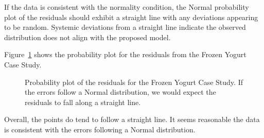 \documentclass[
  letterpaper,
  DIV=11,
  numbers=noendperiod]{scrreprt}
\theoremstyle{plain}
\theoremstyle{definition}
\theoremstyle{definition}
\theoremstyle{remark}
\begin{document}
\begin{tcolorbox}[enhanced jigsaw, breakable, titlerule=0mm, colframe=quarto-callout-note-color-frame, bottomtitle=1mm, opacityback=0, rightrule=.15mm, toptitle=1mm, arc=.35mm, bottomrule=.15mm, left=2mm, title=\textcolor{quarto-callout-note-color}{\faInfo}\hspace{0.5em}{Graphically Assessing the Normality Condition}, leftrule=.75mm, coltitle=black, toprule=.15mm, colbacktitle=quarto-callout-note-color!10!white, colback=white, opacitybacktitle=0.6]

If the data is consistent with the normality condition, the Normal
probability plot of the residuals should exhibit a straight line with
any deviations appearing to be random. Systemic deviations from a
straight line indicate the observed distribution does not align with the
proposed model.

\end{tcolorbox}

Figure~\ref{fig-blockassessment-normal-yogurt} shows the probability
plot for the residuals from the Frozen Yogurt Case Study.

\begin{figure}


\caption{\label{fig-blockassessment-normal-yogurt}Probability plot of
the residuals for the Frozen Yogurt Case Study. If the errors follow a
Normal distribution, we would expect the residuals to fall along a
straight line.}

\end{figure}%

Overall, the points do tend to follow a straight line. It seems
reasonable the data is consistent with the errors following a Normal
distribution.
\end{document}
